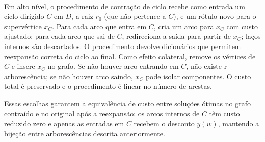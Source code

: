 \documentclass[12pt,a4paper]{article}
\def\emph#1{#1}%
\begin{document}

\paragraph{} Em alto nível, o procedimento de contração de ciclo recebe como entrada um ciclo dirigido $C$ em $D$, a raiz $r_0$ (que não pertence a $C$), e um rótulo novo para o supervértice $x_C$. Para cada arco que entra em $C$, cria um arco para $x_C$ com custo ajustado; para cada arco que sai de $C$, redireciona a saída para partir de $x_C$; laços internos são descartados. O procedimento devolve dicionários que permitem reexpansão correta do ciclo ao final. Como efeito colateral, remove os vértices de $C$ e insere $x_C$ no grafo. Se não houver arco entrando em $C$, não existe r-arborescência; se não houver arco saindo, $x_C$ pode isolar componentes. O custo total é preservado e o procedimento é linear no número de arestas.

Essas escolhas garantem a \emph{equivalência de custo} entre soluções ótimas no grafo contraído e no original após a reexpansão: os arcos internos de \(C\) têm custo reduzido zero e apenas as entradas em \(C\) recebem o desconto \(y(w)\), mantendo a bijeção entre arborescências descrita anteriormente.
\end{document}
